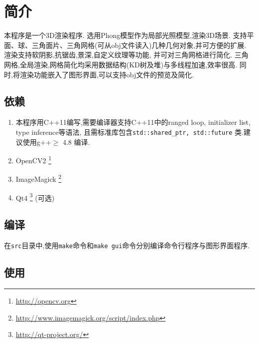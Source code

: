 
\section{简介}
本程序是一个3D渲染程序.
选用Phong模型\cite{phong}作为局部光照模型,渲染3D场景.
支持平面、球、三角面片、三角网格(可从obj文件读入)几种几何对象,并可方便的扩展.
渲染支持软阴影,抗锯齿,景深,自定义纹理等功能, 并可对三角网格进行简化.
三角网格,全局渲染,网格简化均采用数据结构(KD树及堆)与多线程加速,效率很高.
同时,将渲染功能嵌入了图形界面,可以支持obj文件的预览及简化.

\subsection{依赖}
\begin{enumerate}
  \item 本程序用C++11编写,需要编译器支持C++11中的ranged loop, initializer list, type inference等语法,
    且需标准库包含\verb|std::shared_ptr, std::future|
    类.建议使用g++$ \ge$ 4.8 编译.

  \item OpenCV2 \footnote{\url{http://opencv.org}}

  \item ImageMagick \footnote{\url{http://www.imagemagick.org/script/index.php}}

\item Qt4  \footnote{\url{http://qt-project.org/}} (可选)
\end{enumerate}


\subsection{编译}
在\verb|src|目录中,使用\verb|make|命令和\verb|make gui|命令分别编译命令行程序与图形界面程序.

\subsection{使用}

